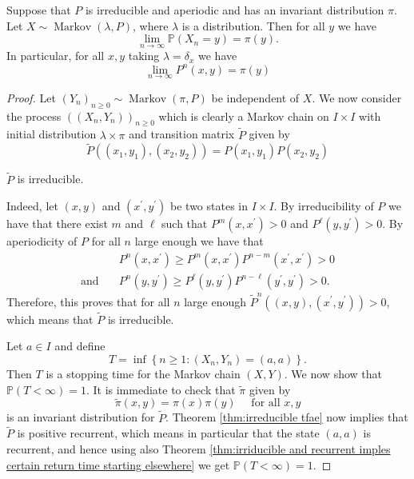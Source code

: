 \documentclass[a4paper]{article}
\begin{document}
\begin{theorem}\label{thm:Convergence to equilibrium}
    Suppose that $P$ is irreducible and aperiodic and has an invariant distribution $\pi$. Let $X \sim \operatorname{Markov}(\lambda, P)$, where $\lambda$ is a distribution. Then for all $y$ we have
    \[
    \lim _{n \rightarrow \infty} \mathbb{P}\left(X_n=y\right)=\pi(y) .
    \]
    In particular, for all $x, y$ taking $\lambda=\delta_x$ we have
    \[
    \lim _{n \rightarrow \infty} P^n(x, y)=\pi(y)
    \]
\end{theorem}
\begin{proof}
    Let $\left(Y_n\right)_{n \geq 0} \sim \operatorname{Markov}(\pi, P)$ be independent of $X$. We now consider the process $\left(\left(X_n, Y_n\right)\right)_{n \geq 0}$ which is clearly a Markov chain on $I \times I$ with initial distribution $\lambda \times \pi$ and transition matrix $\widetilde{P}$ given by
    \[
    \widetilde{P}\left(\left(x_1, y_1\right),\left(x_2,y_2\right)\right)=P\left(x_1, y_1\right) P\left(x_2, y_2\right)
    \]
    \begin{claim}
        $ \widetilde{P} $ is irreducible. 
    \end{claim}
    Indeed, let $(x, y)$ and $\left(x^{\prime}, y^{\prime}\right)$ be two states in $I \times I$. By irreducibility of $P$ we have that there exist $m$ and $\ell$ such that $P^m\left(x, x^{\prime}\right)>0$ and $P^{\ell}\left(y, y^{\prime}\right)>0$. By aperiodicity of $P$ for all $n$ large enough we have that
    \begin{align*}
        &P^n\left(x, x^{\prime}\right) \geq P^m\left(x, x^{\prime}\right) P^{n-m}\left(x^{\prime}, x^{\prime}\right)>0\\ \text {and}\quad & P^n\left(y, y^{\prime}\right) \geq P^{\ell}\left(y, y^{\prime}\right) P^{n-\ell}\left(y^{\prime}, y^{\prime}\right)>0 .
    \end{align*}
    Therefore, this proves that for all $n$ large enough $\widetilde{P}^n\left((x, y),\left(x^{\prime}, y^{\prime}\right)\right)>0$, which means that $\widetilde{P}$ is irreducible.

    Let $a \in I$ and define
    \[
    T=\inf \left\{n \geq 1:\left(X_n, Y_n\right)=(a, a)\right\} .
    \]
    Then $T$ is a stopping time for the Markov chain $(X, Y)$. We now show that $\mathbb{P}(T<\infty)=1$. It is immediate to check that $\widetilde{\pi}$ given by
    \[
    \widetilde{\pi}(x, y)=\pi(x) \pi(y) \quad \text { for all } x, y
    \]
    is an invariant distribution for $\widetilde{P}$. Theorem \ref{thm:irreducible tfae} now implies that $\widetilde{P}$ is positive recurrent, which means in particular that the state $(a, a)$ is recurrent, and hence using also Theorem \ref{thm:irriducible and recurrent imples certain return time starting elsewhere} we get $\mathbb{P}(T<\infty)=1$.


\end{proof}
\end{document}
